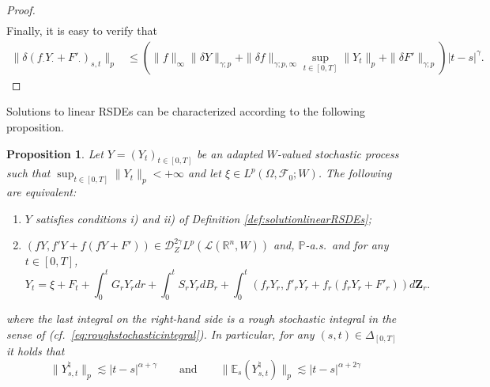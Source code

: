 \documentclass[11pt,a4paper]{article}
\newcommand{\R}{\mathbb{R}}
\newcommand{\E}{\mathbb{E}}
\theoremstyle{plain}
\newtheorem{prop}[defn]{Proposition}
\begin{document}
\begin{proof}
\begin{equation}
\begin{aligned}
    \end{aligned}
\end{equation} 
Finally, it is easy to verify that \begin{equation*} \begin{aligned}
    \|\delta(f_\cdot Y_\cdot+F'_\cdot )_{s,t}\|_p &\le (\|f\|_\infty \|\delta Y\|_{\gamma;p}  + \|\delta f\|_{\gamma;p,\infty} \sup_{t \in [0,T]}\|Y_t\|_p + \|\delta F'\|_{\gamma;p}) |t-s|^\gamma.  
\end{aligned}
\end{equation*} 
\end{proof} 

Solutions to linear RSDEs can be characterized according to the following proposition. 
\begin{prop} \label{prop:characterizationsolutionslinearRSDEs} 
    Let $Y=(Y_t)_{t \in [0,T]}$ be an adapted $W$-valued stochastic process such that
        $\sup_{t \in [0,T]} \|Y_t\|_p<+\infty$ and let $\xi \in L^p(\Omega,\mathcal{F}_0;W)$.  The following are equivalent:
    \begin{enumerate} 
        \item[(i)] $Y$ satisfies conditions i) and ii) of Definition \ref{def:solutionlinearRSDEs};
        \item[(ii)] $(fY,f'Y+f(f Y+F'))\in \mathscr{D}^{2\gamma}_ZL^p(\mathscr{L}(\R^n,W))$ and, $\mathbb{P}$-a.s.\ and for any $t \in [0,T]$, \begin{equation*}\label{eq:RSDEintegralform}
            Y_t = \xi + F_t +\int_0^t G_rY_rdr +\int_0^tS_rY_rdB_r + \int_0^t (f_rY_r,f'_rY_r+f_r(f_rY_r+F'_r)) d\mathbf{Z}_r.
        \end{equation*} 
    \end{enumerate}
    where the last integral on the right-hand side is a rough stochastic integral in the sense of \cite{FHL21} (cf.\ \eqref{eq:roughstochasticintegral}). 
    In particular, for any $(s,t)\in\Delta_{[0,T]}$ it holds that \begin{equation*}
        \|Y^\natural_{s,t}\|_p \lesssim |t-s|^{\alpha+\gamma} \qquad \text{and} \qquad \|\E_s(Y^\natural_{s,t})\|_p \lesssim |t-s|^{\alpha+2\gamma}
    \end{equation*}
\end{prop}
\end{document}
